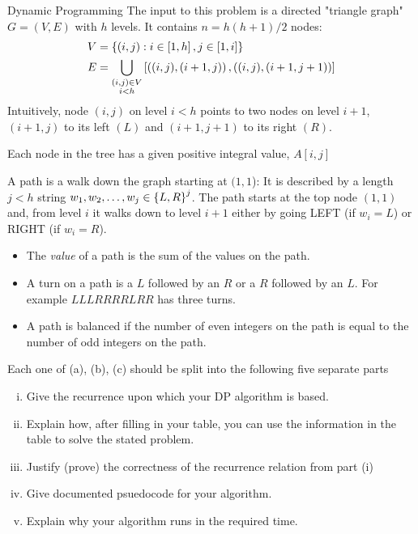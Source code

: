 \documentclass{article}
\numberwithin{table}{section}
\numberwithin{figure}{section}
\begin{document}
\newpage

\begin{section}{Dynamic Programming}
The input to this problem is a directed "triangle graph" $G = (V, E)$ with $h$ levels. It contains $n = h(h+1)/2$ nodes:
\begin{align*}
    V &= \left\{(i, j) :  i \in \left[1, h\right], j \in [1, i]\right\} \\
    E &= \bigcup_{\substack{(i,j) \in V \\ i < h}} \left[\left((i,j), (i+1, j)\right), \left((i, j ), (i+1, j+1)\right)\right]
\end{align*}
Intuitively, node $(i,j)$ on level $i < h$ points to two nodes on level $i + 1$, $(i + 1, j)$ to its left $(L)$ and $(i + 1, j + 1)$ to its right $(R)$.

Each node in the tree has a given positive integral value, $A[i,j]$

A path is a walk down the graph starting at $(1, 1$): It is described by a length $j < h$ string $w_1, w_2, \dots, w_j \in \left\{L, R\right\}^j$. The path starts at the top node $(1, 1)$ and, from level $i$ it walks down to level $i + 1$ either by going LEFT (if $w_i = L$) or RIGHT (if $w_i = R$).

\begin{itemize}
    \item The \emph{value} of a path is the sum of the values on the path.
    \item A turn on a path is a $L$ followed by an $R$ or a $R$ followed by an $L$. For example $LLLRRRRLRR$ has three turns.
    \item A path is balanced if the number of even integers on the path is equal to the number of odd integers on the path.
\end{itemize}

Each one of (a), (b), (c) should be split into the following five separate parts
\begin{enumerate}[(i)]
    \item Give the recurrence upon which your DP algorithm is based.
    \item Explain how, after filling in your table, you can use the information in the table to solve the stated problem.
    \item Justify (prove) the correctness of the recurrence relation from part (i)
    \item Give documented psuedocode for your algorithm.
    \item Explain why your algorithm runs in the required time.
\end{enumerate} 


\end{section}
\end{document}
